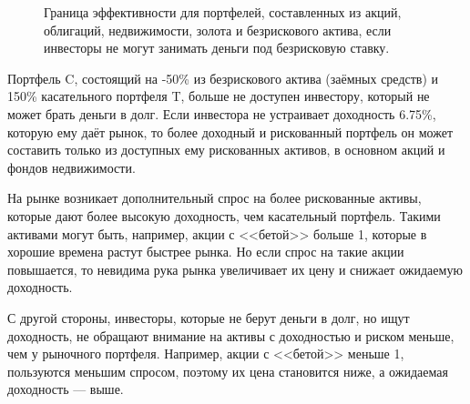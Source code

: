 \begin{figure}[h]

\caption{Граница эффективности для портфелей, составленных из акций, облигаций, недвижимости, золота и безрискового актива, если инвесторы не могут занимать деньги под безрисковую ставку.}
\label{efficient_frontier_with_risk_free_no_leverage}
\end{figure}

Портфель C, состоящий на -50\% из безрискового актива (заёмных средств) и 150\% 
касательного портфеля T, больше не доступен инвестору, который не может брать 
деньги в долг. Если инвестора не устраивает доходность 6.75\%, которую ему даёт
рынок, то более доходный и рискованный портфель он может составить только из 
доступных ему  рискованных активов, в основном акций и фондов недвижимости.

На рынке возникает дополнительный спрос на более рискованные активы, которые 
дают более высокую доходность, чем касательный портфель. Такими активами могут
быть, например, акции с <<бетой>> больше 1, которые в хорошие времена растут
быстрее рынка. Но если спрос на такие акции повышается, то невидима рука рынка
увеличивает их цену и снижает ожидаемую доходность.

С другой стороны, инвесторы, которые не берут деньги в долг, но ищут 
доходность, не обращают внимание на активы с доходностью и риском меньше, чем у 
рыночного портфеля. Например, акции с <<бетой>> меньше 1, пользуются меньшим 
спросом, поэтому их цена становится ниже, а ожидаемая доходность --- выше.

